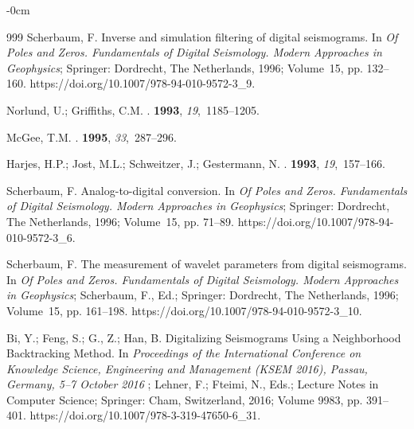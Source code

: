 \documentclass[sensors,article,accept,moreauthors,pdftex]{Definitions/mdpi}
\begin{document}
\begin{adjustwidth}{-\extralength}{0cm}
\begin{thebibliography}{999}
Scherbaum, F.
\newblock Inverse and simulation filtering of digital seismograms. In {\em Of
  Poles and Zeros. Fundamentals of Digital Seismology. Modern Approaches in
  Geophysics};  Springer: Dordrecht, The Netherlands,  1996; Volume~15,
  pp. 132--160.
\newblock
{https://doi.org/10.1007/978-94-010-9572-3\_9}.

Norlund, U.; Griffiths, C.M.
.
 {\bf 1993}, {\em 19},~1185--1205.

McGee, T.M.
.
 {\bf 1995}, {\em 33},~287--296.

Harjes, H.P.; Jost, M.L.; Schweitzer, J.; Gestermann, N.
.
 {\bf 1993}, {\em 19},~157--166.

Scherbaum, F.
\newblock Analog-to-digital conversion. In {\em Of Poles and Zeros.
  Fundamentals of Digital Seismology. Modern Approaches in Geophysics};
  Springer: Dordrecht, The Netherlands,  1996; Volume~15, pp. 71--89.
\newblock
{https://doi.org/10.1007/978-94-010-9572-3\_6}.

Scherbaum, F.
\newblock The measurement of wavelet parameters from digital seismograms. In
  {\em Of Poles and Zeros. Fundamentals of Digital Seismology. Modern
  Approaches in Geophysics}; Scherbaum, F., Ed.; Springer: Dordrecht,
  The Netherlands,  1996; Volume~15, \linebreak pp. 161--198.
\newblock
{https://doi.org/10.1007/978-94-010-9572-3\_10}.

Bi, Y.; Feng, S.; G., Z.; Han, B.
\newblock Digitalizing Seismograms Using a Neighborhood Backtracking Method. 
 In \emph{Proceedings of the International Conference on Knowledge Science, Engineering and
  Management (KSEM 2016), Passau, Germany, 5--7 October 2016} ; Lehner, F.;
  Fteimi, N., Eds.; Lecture Notes in Computer Science; Springer: Cham, Switzerland,  2016; Volume 9983, pp.
  391--401. %
\newblock
{https://doi.org/10.1007/978-3-319-47650-6\_31}.


\end{thebibliography}
\end{adjustwidth}
\end{document}
